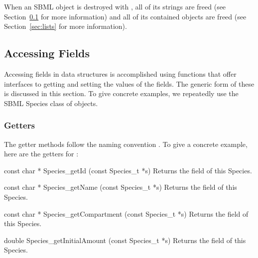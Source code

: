 \documentclass{sbmlmanual}
\begin{document}
When an SBML object is destroyed with , all of its
strings are freed (see Section~\ref{sec:accessing-fields} for more
information) and all of its contained objects are freed (see
Section~\ref{sec:lists} for more information).


\subsection{Accessing Fields}
\label{sec:accessing-fields}

Accessing fields in data structures is accomplished using functions that
offer interfaces to getting and setting the values of the fields.  The
generic form of these is discussed in this section.  To give concrete
examples, we repeatedly use the SBML Species class of objects.

\subsubsection{Getters}

The getter methods follow the naming convention .  To
give a concrete example, here are the getters for :


\begin{methoddef}{const char * Species\_getId (const Species\_t *s)}
  Returns the  field of this Species.
\end{methoddef}


\begin{methoddef}{const char * Species\_getName (const Species\_t *s)}
  Returns the  field of this Species.
\end{methoddef}


\begin{methoddef}{const char * Species\_getCompartment (const Species\_t *s)}
  Returns the  field of this Species.
\end{methoddef}


\begin{methoddef}{double Species\_getInitialAmount (const Species\_t *s)}
  Returns the  field of this Species.
\end{methoddef}
\end{document}
